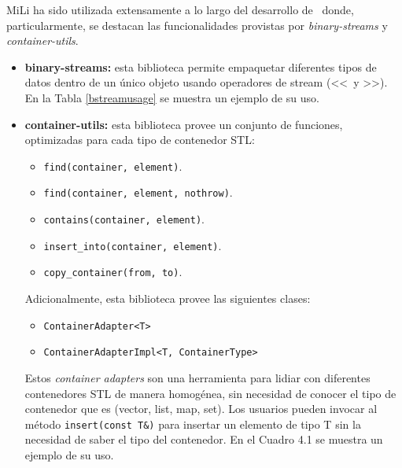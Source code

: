 		MiLi ha sido utilizada extensamente a lo largo del desarrollo de \combeng \ donde, particularmente, se destacan las funcionalidades provistas por 
		\textit{binary-streams} y \textit{container-utils}.
		\begin{itemize}
			\item \textbf{binary-streams:} esta biblioteca permite empaquetar diferentes tipos de datos dentro de un \'unico objeto usando operadores de
        stream (\textless\textless \ y \textgreater\textgreater). En la Tabla \ref{bstreamusage} se muestra un ejemplo de su uso.
			\item \textbf{container-utils:} esta biblioteca provee un conjunto de funciones, optimizadas para cada tipo de contenedor STL:
				\begin{itemize}
					\item \texttt{find(container, element)}.
					\item \texttt{find(container, element, nothrow)}.
					\item \texttt{contains(container, element)}.
					\item \texttt{insert\_into(container, element)}.
					\item \texttt{copy\_container(from, to)}.
				\end{itemize}
								
				Adicionalmente, esta biblioteca provee las siguientes clases:
				\begin{itemize}
					\item \texttt{ContainerAdapter<T>}
					\item \texttt{ContainerAdapterImpl<T, ContainerType>}
				\end{itemize}
				Estos \textit{container adapters} son una herramienta para lidiar con diferentes contenedores STL de manera homog\'enea, sin necesidad de conocer 
				el tipo de contenedor que es (vector, list, map, set). Los usuarios pueden invocar al m\'etodo \texttt{insert(const T\&)} para insertar un 
				elemento de tipo T sin la necesidad de saber el tipo del contenedor. En el Cuadro 4.1 se muestra un ejemplo de su uso.
		\end{itemize}
		

